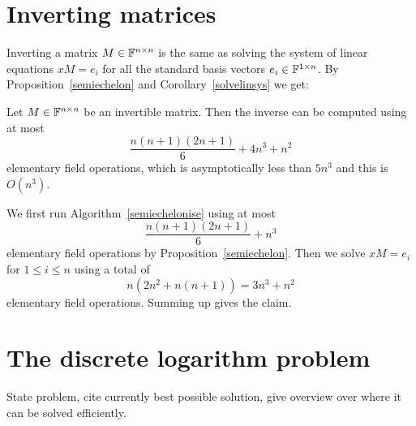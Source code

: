 \section{Inverting matrices}
\label{sec:invert}

Inverting a matrix $M \in \mathbb{F}^{n \times n}$ is the same as solving the
system of linear equations $xM = e_i$ for all the standard basis
vectors $e_i \in \mathbb{F}^{1 \times n}$. By Proposition~\ref{semiechelon}
and Corollary~\ref{solvelinsys} we get:

\begin{Prop}
Let $M \in \mathbb{F}^{n \times n}$ be an invertible matrix. Then the inverse
can be computed using at most
\[ \frac{n(n+1)(2n+1)}{6} + 4n^3 + n^2 \]
elementary field operations, which is asymptotically less than $5n^3$
and this is $O(n^3)$.
\end{Prop}
\proofbeg
We first run Algorithm~\ref{semiechelonise} using at most
\[ \frac{n(n+1)(2n+1)}{6} + n^3 \]
elementary field operations by Proposition~\ref{semiechelon}. Then
we solve $xM = e_i$ for $1 \le i \le n$ using a total of
\[ n(2n^2+n(n+1)) = 3n^3+n^2 \]
elementary field operations. Summing up gives the claim.
\proofend

\section{The discrete logarithm problem}
\label{thedlp}

State problem, cite currently best possible solution, give overview
over where it can be solved efficiently.

